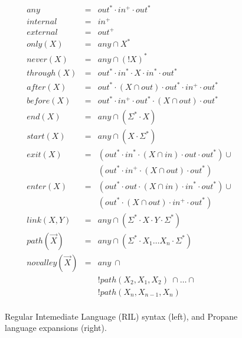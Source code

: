 \begin{figure}
\begin{minipage}[t]{.45\linewidth}
  \end{minipage}
  ~~
  \vrule
  ~~
  \begin{minipage}[t]{.5\linewidth}
  \vspace*{-1\baselineskip}
  \[ \begin{array}{rcl}
    \hline
    any           & = & out^* \cdot in^+ \cdot out^* \\
    internal      & = & in^+ \\
    external      & = & out^+ \\
    only(X)       & = & any \cap X^* \\
    never(X)      & = & any \cap (!X)^* \\
    through(X)    & = & out^* \cdot in^* \cdot X \cdot in^* \cdot out^* \\
    after(X)      & = & out^* \cdot (X \cap out) \cdot out^* \cdot in^+ \cdot out^* \\
    before(X)     & = & out^* \cdot in^+ \cdot out^* \cdot (X \cap out) \cdot out^* \\
    end(X)        & = & any \cap (\Sigma^* \cdot X) \\
    start(X)      & = & any \cap (X \cdot \Sigma^*) \\
    exit(X)       & = & (out^* \cdot in^* \cdot (X \cap in) \cdot out \cdot out^*) \cup \\
                  &        & (out^* \cdot in^+ \cdot (X \cap out) \cdot out^*) \\
    enter(X)      & = & (out^* \cdot out \cdot (X \cap in) \cdot in^* \cdot out^*) \cup \\
                  &        & (out^* \cdot (X \cap out) \cdot in^+ \cdot out^*) \\
    link(X,Y)     & = & any \cap (\Sigma^* \cdot X \cdot Y \cdot \Sigma^*) \\
    path(\vec{X}) & = & any \cap (\Sigma^* \cdot X_1 \dots X_n \cdot \Sigma^*) \\
    novalley(\vec{X}) & = & any ~ \cap \\
                  &   & !path(X_2,X_1,X_2) ~ \cap \dots \cap \\ 
                  &   & !path(X_n,X_{n-1},X_n) \\
  \end{array} \]

  \end{minipage}

  \hrulefill

  \caption{Regular Intemediate Language (RIL) syntax (left), and 
           Propane language expansions (right).}
  \label{fig:semantics}
\end{figure}

